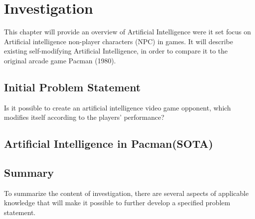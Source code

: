 
\section{Investigation} \label{sec:preanalysus}
This chapter will provide an overview of Artificial Intelligence were it set focus on Artificial intelligence non-player characters (NPC) in games. It will describe existing self-modifying Artificial Intelligence, in order to compare it to the original arcade game Pacman (1980).


\subsection{Initial Problem Statement} \label{sec:initialproblemstatement}
Is it possible to create an artificial intelligence video game opponent, which modifies itself according to the players' performance?



\subsection{Artificial Intelligence in Pacman(SOTA)}



\subsection{Summary}
To summarize the content of investigation, there are several aspects of applicable knowledge that will make it possible to further develop a specified problem statement.

